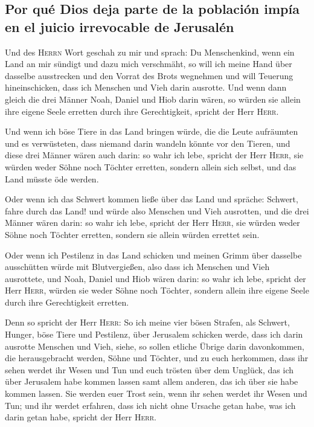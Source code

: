 \hypertarget{por-quuxe9-dios-deja-parte-de-la-poblaciuxf3n-impuxeda-en-el-juicio-irrevocable-de-jerusaluxe9n}{%
\subsection{Por qué Dios deja parte de la población impía en el juicio
irrevocable de
Jerusalén}\label{por-quuxe9-dios-deja-parte-de-la-poblaciuxf3n-impuxeda-en-el-juicio-irrevocable-de-jerusaluxe9n}}

 Und des \textsc{Herrn} Wort geschah zu mir und sprach:
 Du Menschenkind, wenn ein Land an mir sündigt und dazu
mich verschmäht, so will ich meine Hand über dasselbe ausstrecken und
den Vorrat des Brots wegnehmen und will Teuerung hineinschicken, dass
ich Menschen und Vieh darin ausrotte.  Und wenn dann
gleich die drei Männer Noah, Daniel und Hiob darin wären, so würden sie
allein ihre eigene Seele erretten durch ihre Gerechtigkeit, spricht der
Herr \textsc{Herr}.

 Und wenn ich böse Tiere in das Land bringen würde, die
die Leute aufräumten und es verwüsteten, dass niemand darin wandeln
könnte vor den Tieren,  und diese drei Männer wären auch
darin: so wahr ich lebe, spricht der Herr \textsc{Herr}, sie würden
weder Söhne noch Töchter erretten, sondern allein sich selbst, und das
Land müsste öde werden.

 Oder wenn ich das Schwert kommen ließe über das Land und
spräche: Schwert, fahre durch das Land! und würde also Menschen und Vieh
ausrotten,  und die drei Männer wären darin: so wahr ich
lebe, spricht der Herr \textsc{Herr}, sie würden weder Söhne noch
Töchter erretten, sondern sie allein würden errettet sein.

 Oder wenn ich Pestilenz in das Land schicken und meinen
Grimm über dasselbe ausschütten würde mit Blutvergießen, also dass ich
Menschen und Vieh ausrottete,  und Noah, Daniel und Hiob
wären darin: so wahr ich lebe, spricht der Herr \textsc{Herr}, würden
sie weder Söhne noch Töchter, sondern allein ihre eigene Seele durch
ihre Gerechtigkeit erretten.

 Denn so spricht der Herr \textsc{Herr}: So ich meine
vier bösen Strafen, als Schwert, Hunger, böse Tiere und Pestilenz, über
Jerusalem schicken werde, dass ich darin ausrotte Menschen und Vieh,
 siehe, so sollen etliche Übrige darin davonkommen, die
herausgebracht werden, Söhne und Töchter, und zu euch herkommen, dass
ihr sehen werdet ihr Wesen und Tun und euch trösten über dem Unglück,
das ich über Jerusalem habe kommen lassen samt allem anderen, das ich
über sie habe kommen lassen.  Sie werden euer Trost sein,
wenn ihr sehen werdet ihr Wesen und Tun; und ihr werdet erfahren, dass
ich nicht ohne Ursache getan habe, was ich darin getan habe, spricht der
Herr \textsc{Herr}.

